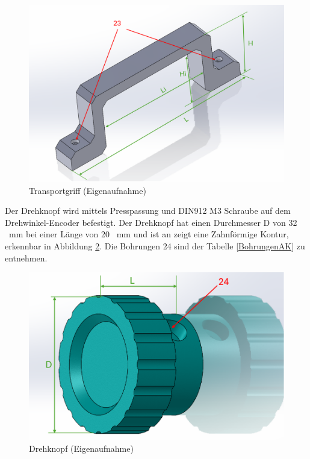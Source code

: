 \begin{figure}[H]
	\begin{center}
		\includegraphics[width=\textwidth]{Images/Konstruktion/GriffK.png}
		\caption{Transportgriff (Eigenaufnahme)} \label{GriffK}
	\end{center}
\end{figure}  

Der Drehknopf wird mittels Presspassung und DIN912 M3 Schraube auf dem Drehwinkel-Encoder befestigt. Der Drehknopf hat einen Durchmesser D von 32 \ mm bei einer Länge von 20 \ mm und ist an zeigt eine Zahnförmige Kontur, erkennbar in Abbildung \ref{DrehKnopfK}. Die Bohrungen 24 sind der Tabelle \ref{BohrungenAK} zu entnehmen.

\begin{figure}[H]
	\begin{center}
		\includegraphics[width=\textwidth]{Images/Konstruktion/DrehKnopfK.png}
		\caption{Drehknopf (Eigenaufnahme)} \label{DrehKnopfK}
	\end{center}
\end{figure}  

